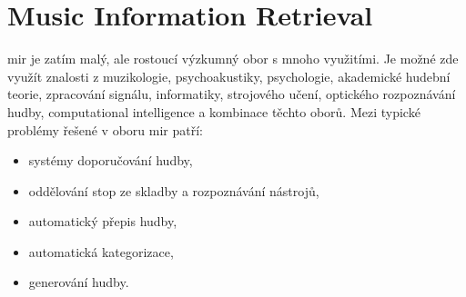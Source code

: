 \documentclass[thesis=B, czech]{FITthesis}[2019/03/06]
\begin{document}



\section{Music Information Retrieval} \label{MIR}

\gls{mir} je zatím malý, ale rostoucí výzkumný obor s mnoho využitími. Je možné zde využít znalosti z muzikologie, psychoakustiky, psychologie, akademické hudební teorie, zpracování signálu, informatiky, strojového učení, optického rozpoznávání hudby, computational intelligence a kombinace těchto oborů. Mezi typické problémy řešené v oboru \gls{mir} patří:

\begin{itemize}
    \item systémy doporučování hudby,
    \item oddělování stop ze skladby a rozpoznávání nástrojů,
    \item automatický přepis hudby,
    \item automatická kategorizace,
    \item generování hudby.
\end{itemize}
\end{document}
